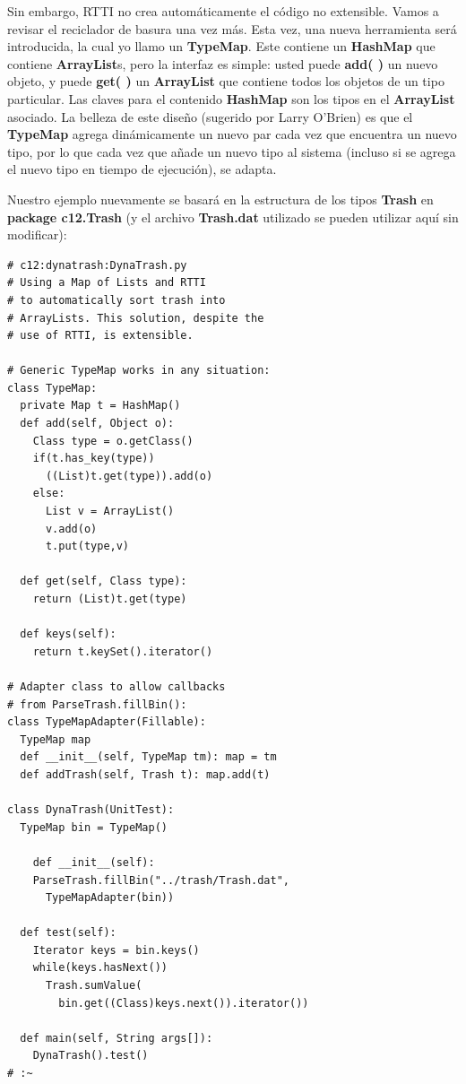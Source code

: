 \documentclass{article}
\begin{document}
Sin embargo, RTTI no crea automáticamente el código no extensible. Vamos a revisar el reciclador de basura una vez más. Esta vez, una nueva herramienta será introducida, la cual yo llamo un \textbf{TypeMap}. Este contiene un \textbf{HashMap} que contiene \textbf{ArrayList}s, pero la interfaz es simple: usted puede \textbf{add( )} un nuevo objeto, y puede \textbf{get( )} un \textbf{ArrayList} que contiene todos los objetos de un tipo particular. Las claves para el contenido \textbf{HashMap} son los tipos en el \textbf{ArrayList} asociado. La belleza de este diseño (sugerido por Larry O'Brien) es que el \textbf{TypeMap} agrega dinámicamente un nuevo par cada vez que encuentra un nuevo tipo, por lo que cada vez que añade un nuevo tipo al sistema (incluso si se agrega el nuevo tipo en tiempo de ejecución), se adapta.  \newline

Nuestro ejemplo  nuevamente se basará en la estructura de los tipos \textbf{Trash} en \textbf{package c12.Trash} (y el archivo \textbf{Trash.dat} utilizado se pueden utilizar aquí sin modificar):        \newline

\begin{lstlisting} 
# c12:dynatrash:DynaTrash.py  
# Using a Map of Lists and RTTI 
# to automatically sort trash into 
# ArrayLists. This solution, despite the 
# use of RTTI, is extensible. 

# Generic TypeMap works in any situation: 
class TypeMap: 
  private Map t = HashMap() 
  def add(self, Object o): 
    Class type = o.getClass() 
    if(t.has_key(type)) 
      ((List)t.get(type)).add(o) 
    else: 
      List v = ArrayList() 
      v.add(o) 
      t.put(type,v) 
      
  def get(self, Class type): 
    return (List)t.get(type) 
    
  def keys(self):  
    return t.keySet().iterator()  
    
# Adapter class to allow callbacks 
# from ParseTrash.fillBin(): 
class TypeMapAdapter(Fillable): 
  TypeMap map 
  def __init__(self, TypeMap tm): map = tm  
  def addTrash(self, Trash t): map.add(t)  
  
class DynaTrash(UnitTest): 
  TypeMap bin = TypeMap() 
  
    def __init__(self): 
    ParseTrash.fillBin("../trash/Trash.dat",  
      TypeMapAdapter(bin)) 
      
  def test(self): 
    Iterator keys = bin.keys() 
    while(keys.hasNext()) 
      Trash.sumValue( 
        bin.get((Class)keys.next()).iterator())
        
  def main(self, String args[]): 
    DynaTrash().test() 
# :~ 
\end{lstlisting}
\end{document}
